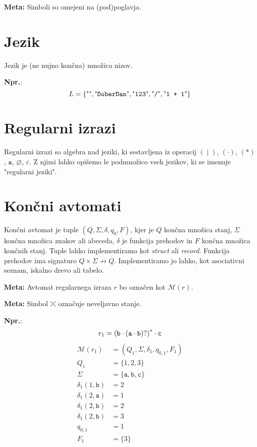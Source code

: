 \documentclass{article}
\newcommand{\Ex}{\textbf{Npr.}:\ }
\newcommand{\Special}[1]{\textbf{#1}}
\newcommand{\Empty}{\varnothing}
\newcommand{\Null}{\varepsilon}
\newcommand{\Alphabet}{\Sigma}
\newcommand{\Automaton}[1]{\mathcal{M}(#1)}
\newcommand{\Str}[1]{\text{\textquotedbl\texttt{#1}\textquotedbl}}
\newcommand{\Char}[1]{\texttt{#1}}
\newcommand{\Seq}{\cdot}
\newcommand{\Union}{\mathrel{|}}
\newcommand{\Kleene}[1]{{#1}^\ast}
\newcommand{\Err}{\rdiagovfdiag}
\begin{document}
\Special{Meta:} Simboli so omejeni na (pod)poglavja.

\section{Jezik}
Jezik je (ne nujno končna) množica nizov.

\Ex
\begin{equation*}
  L = \{\Str{}, \Str{DoberDan}, \Str{123}, \Str{/}, \Str{1 + 1} \}
\end{equation*}

\section{Regularni izrazi}
Regularni izrazi so algebra nad jeziki, ki sestavljena iz operacij $(\Union)$, $(\Seq)$, $(\ast)$, $\Char{a}$, $\Empty$, $\Null$.
Z njimi lahko opišemo le podmnožico vseh jezikov, ki se imenuje "regularni jeziki".

\section{Končni avtomati}

Končni avtomat je tuple $(Q, \Alphabet, \delta, q_0, F)$, kjer je $Q$ končna množica stanj, $\Sigma$ končna množica znakov ali abeceda, $\delta$ je funkcija prehodov in $F$ končna množica končnih stanj.
Tuple lahko implementiramo kot \emph{struct} ali \emph{record}.
Funkcija prehodov ima signaturo $Q \times \Sigma \not\rightarrow Q$.
Implementiramo jo lahko, kot asociativni seznam, iskalno drevo ali tabelo.

\Special{Meta:} Avtomat regularnega izraza $r$ bo označen kot $\Automaton{r}$.

\Special{Meta:} Simbol $\Err$ označuje neveljavno stanje.

\Ex
\begin{equation}
  r_1 = \Kleene{(\Char{b} \Seq (\Char{a} \Seq \Char{b})?)} \Seq \Char{c} \\
\end{equation}
\begin{align*}
  \Automaton{r_1} &= (Q_1, \Sigma, \delta_1, q_{0, 1}, F_1)\\[1em]
  Q_1 &= \{1, 2, 3\} \\[1em]
  \Sigma &= \{\Char{a}, \Char{b}, \Char{c}\} \\[1em]
  \delta_1(1, \Char{b}) & =  2\\
  \delta_1(2, \Char{a}) & =  1\\
  \delta_1(2, \Char{b}) & =  2\\
  \delta_1(2, \Char{b}) & =  3\\[1em]
  q_{0, 1} &= 1 \\[1em]
  F_1 &= \{3\}
\end{align*}
\end{document}
